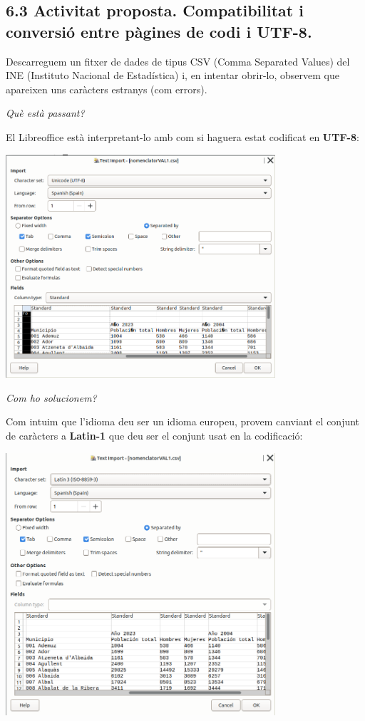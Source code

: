\documentclass[
  12 pt,
  a4paper,
]{article}
\begin{document}
\subsection{6.3 Activitat proposta. Compatibilitat i conversió entre
pàgines de codi i
UTF-8.}\label{activitat-proposta.-compatibilitat-i-conversiuxf3-entre-puxe0gines-de-codi-i-utf-8.}

Descarreguem un fitxer de dades de tipus CSV (Comma Separated Values)
del INE (Instituto Nacional de Estadística) i, en intentar obrir-lo,
observem que apareixen uns caràcters estranys (com errors).

\emph{Què està passant?}

El Libreoffice està interpretant-lo amb com si haguera estat codificat
en \textbf{UTF-8}:

\includegraphics[width=0.75\textwidth,height=\textheight]{png/csv1.png}

\emph{Com ho solucionem?}

Com intuim que l'idioma deu ser un idioma europeu, provem canviant el
conjunt de caràcters a \textbf{Latin-1} que deu ser el conjunt usat en
la codificació:

\includegraphics[width=0.75\textwidth,height=\textheight]{recursos/csv2.png}
\end{document}
